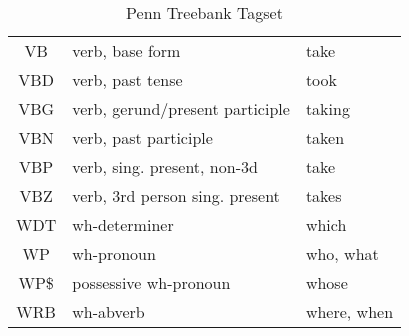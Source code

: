 \begin{table}
{\begin{tabular}{cll}
    VB    & verb, base form & take \\
    VBD   & verb, past tense & took \\
    VBG   & verb, gerund/present participle & taking \\
    VBN   & verb, past participle & taken \\
    VBP   & verb, sing. present, non-3d & take \\
    VBZ   & verb, 3rd person sing. present & takes \\
    WDT   & wh-determiner & which \\
    WP    & wh-pronoun & who, what \\
    WP\$  & possessive wh-pronoun & whose \\
    WRB   & wh-abverb & where, when \\
    \end{tabular}}%
  \caption{Penn Treebank Tagset \protect\cite{PenTreeBank}}
  \label{tab:addlabel}%
\end{table}%
